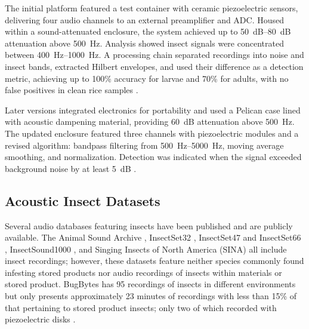The initial platform featured a test container with ceramic piezoelectric sensors, delivering four audio channels to an external preamplifier and ADC. Housed within a sound-attenuated enclosure, the system achieved up to \SIrange{50}{80}{\deci\bel} attenuation above \SI{500}{\hertz}. Analysis showed insect signals were concentrated between \SIrange{400}{1000}{\hertz}. A processing chain separated recordings into noise and insect bands, extracted Hilbert envelopes, and used their difference as a detection metric, achieving up to 100\% accuracy for larvae and 70\% for adults, with no false positives in clean rice samples \cite{flynnAcousticMethodsInvasive2016}.

Later versions integrated electronics for portability and used a Pelican case lined with acoustic dampening material, providing \SI{60}{\deci\bel} attenuation above \SI{500}{\hertz}. The updated enclosure featured three channels with piezoelectric modules and a revised algorithm: bandpass filtering from \SIrange{500}{5000}{\hertz}, moving average smoothing, and normalization. Detection was indicated when the signal exceeded background noise by at least \SI{5}{\deci\bel} \cite{sutinVibroacousticMethodsInsect2017}.

\subsection{Acoustic Insect Datasets}

Several audio databases featuring insects have been published and are publicly available. The Animal Sound Archive \cite{registry-migration.gbif.orgAnimalSoundArchive2016}, InsectSet32 \cite{faissInsectSet32DatasetAutomatic2022}, InsectSet47 and InsectSet66 \cite{faissInsectSet47InsectSet66Expanded2023, faissAdaptiveRepresentationsSound2023}, InsectSound1000 \cite{brandingInsectSound1000InsectSound2024}, and Singing Insects of North America (SINA) \cite{SingingInsectsNorth2024} all include insect recordings; however, these datasets feature neither species commonly found infesting stored products nor audio recordings of insects within materials or stored product. BugBytes has 95 recordings of insects in different environments but only presents approximately 23 minutes of recordings with less than 15\% of that pertaining to stored product insects; only two of which recorded with piezoelectric disks \cite{mankinBugBytesSound2019}.

\newpage
